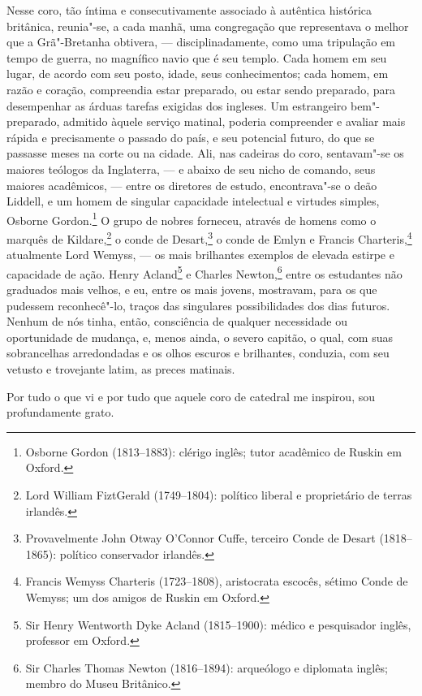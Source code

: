 Nesse coro, tão íntima e consecutivamente associado à autêntica
histórica britânica, reunia"-se, a cada manhã, uma congregação que
representava o melhor que a Grã"-Bretanha obtivera, --- disciplinadamente,
como uma tripulação em tempo de guerra, no magnífico navio que é seu
templo. Cada homem em seu lugar, de acordo com seu posto, idade, seus
conhecimentos; cada homem, em razão e coração, compreendia estar
preparado, ou estar sendo preparado, para desempenhar as árduas tarefas
exigidas dos ingleses. Um estrangeiro bem"-preparado, admitido àquele
serviço matinal, poderia compreender e avaliar mais rápida e
precisamente o passado do país, e seu potencial futuro, do que se
passasse meses na corte ou na cidade. Ali, nas cadeiras do coro,
sentavam"-se os maiores teólogos da Inglaterra, --- e abaixo de seu nicho
de comando, seus maiores acadêmicos, --- entre os diretores de estudo,
encontrava"-se o deão Liddell, e um homem de singular capacidade
intelectual e virtudes simples, Osborne Gordon.\footnote{Osborne Gordon
  (1813--1883): clérigo inglês; tutor acadêmico de Ruskin em Oxford.} O grupo de nobres forneceu, através de homens como o
marquês de Kildare,\footnote{Lord William FiztGerald (1749--1804):
  político liberal e proprietário de terras irlandês.} o
conde de Desart,\footnote{Provavelmente John Otway O'Connor Cuffe, terceiro
  Conde de Desart (1818--1865): político conservador irlandês.} o conde de Emlyn e Francis Charteris,\footnote{Francis Wemyss
  Charteris (1723--1808), aristocrata escocês, sétimo Conde de Wemyss; um dos
  amigos de Ruskin em Oxford.} atualmente Lord Wemyss,
--- os mais brilhantes exemplos de elevada estirpe e capacidade de ação.
Henry Acland\footnote{Sir Henry Wentworth Dyke Acland (1815--1900):
  médico e pesquisador inglês, professor em Oxford.} e
Charles Newton,\footnote{Sir Charles Thomas Newton (1816--1894):
  arqueólogo e diplomata inglês; membro do Museu Britânico.} entre os estudantes não graduados mais velhos, e eu, entre os
mais jovens, mostravam, para os que pudessem reconhecê"-lo, traços das
singulares possibilidades dos dias futuros. Nenhum de nós tinha, então,
consciência de qualquer necessidade ou oportunidade de mudança, e, menos
ainda, o severo capitão, o qual, com suas sobrancelhas arredondadas e os
olhos escuros e brilhantes, conduzia, com seu vetusto e trovejante
latim, as preces matinais.

Por tudo o que vi e por tudo que aquele coro de catedral me inspirou,
sou profundamente grato.


